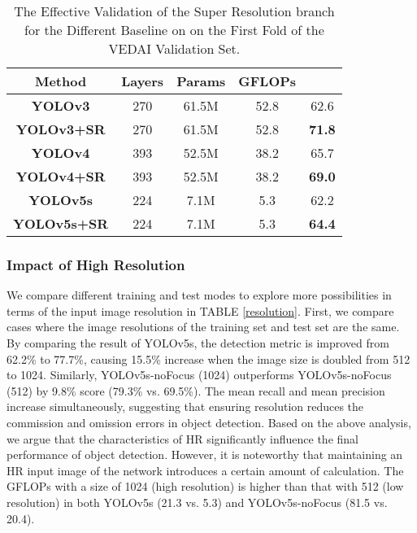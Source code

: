  \begin{table}[htpb]
	\small
	\centering
	{\caption{The Effective Validation of  the Super Resolution branch for the Different  Baseline on on the First Fold of the VEDAI Validation Set.}
	\label{ablationsr}
	\begin{tabular}{c|c|c|c|c}
		\toprule[1.2pt]
        \textbf{Method} & \textbf{Layers} & \textbf{Params}  & \textbf{GFLOPs}  & \textbf{}  \\
		\midrule
		\textbf{YOLOv3}     & 270 & 61.5M & 52.8 & 62.6 \\
		\textbf{YOLOv3+SR}  & 270 & 61.5M & 52.8 & \textbf{71.8} \\
		\midrule
		\textbf{YOLOv4}     & 393 & 52.5M & 38.2 & 65.7 \\
		\textbf{YOLOv4+SR}  & 393 & 52.5M & 38.2 & \textbf{69.0} \\
		\midrule
		\textbf{YOLOv5s}    & 224 & 7.1M  & 5.3  & 62.2 \\
		\textbf{YOLOv5s+SR} & 224 & 7.1M  & 5.3  & \textbf{64.4}   \\ 
		\bottomrule[1.2pt]                                     
	\end{tabular}}
\vspace{-0.1in}
\end{table}


 









\subsubsection{\textbf{Impact of High Resolution}}
We compare different training and test modes to explore more possibilities in terms of the input image resolution in TABLE \ref{resolution}. First, we compare cases where the image resolutions of the training set and test set are the same.
By comparing the result of YOLOv5s, the detection metric  is improved from 62.2\% to 77.7\%, causing 15.5\% increase  when the image size is doubled from 512 to 1024. Similarly, YOLOv5s-noFocus (1024) outperforms YOLOv5s-noFocus (512) by 9.8\%  score (79.3\% vs. 69.5\%). The mean recall and mean precision increase simultaneously, suggesting that ensuring resolution reduces the commission and omission errors in object detection. Based on the above analysis, we argue that the characteristics of HR significantly influence the final performance of object detection. However, it is noteworthy that maintaining an HR input image of the network introduces a certain amount of calculation. The GFLOPs with a size of 1024 (high resolution) is higher than that with 512 (low resolution) in both YOLOv5s (21.3 vs. 5.3) and YOLOv5s-noFocus (81.5 vs. 20.4). 

